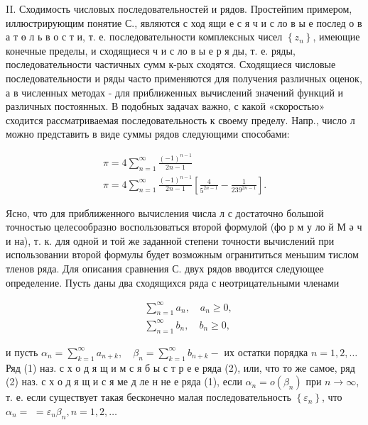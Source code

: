 \documentclass[10pt]{article}
\begin{document}
II. Сходимость числовых последовательностей и рядов. Простейпим примером, иллюстрирующим понятие С., являются с ход ящи е с я ч и с ло в ы е послед о в а т ө л ь в о с т и, т. е. последовательности комплексных чисел $\left\{z_{n}\right\}$, имеющие конечные пределы, и сходящиеся ч и с ло в ы е р я ды, т. е. ряды, последовательности частичных сумм к-рых сходятся. Сходящиеся числовые последовательности и ряды часто применяются для получения различных оценок, а в численных методах - для приближенных вычислений значений функций и различных постоянных. В подобных задачах важно, с какой «скоростью» сходится рассматриваемая последовательность к своему пределу. Напр., число л можно представить в виде суммы рядов следующими способами:



\[

\begin{gathered}

\pi=4 \sum_{n=1}^{\infty} \frac{(-1)^{n-1}}{2 n-1} \\

\pi=4 \sum_{n=1}^{\infty} \frac{(-1)^{n-1}}{2 n-1}\left[\frac{4}{5^{2 n-1}}-\frac{1}{239^{2 n-1}}\right] .

\end{gathered}

\]



Ясно, что для приближенного вычисления числа л с достаточно большой точностью целесообразно воспользоваться второй формулой (фо р м у ло й М ә ч и на), т. к. для одной и той же заданной степени точности вычислений при использовании второй формулы будет возможным огранититься меньшим тислом тленов ряда. Для описания сравнения С. двух рядов вводится следующее определение. Пусть даны два сходящихся ряда с неотрицательными членами



\[

\begin{aligned}

& \sum_{n=1}^{\infty} a_{n}, \quad a_{n} \geqslant 0, \\

& \sum_{n=1}^{\infty} b_{n}, \quad b_{n} \geqslant 0,

\end{aligned}

\]



и пусть $\alpha_{n}=\sum_{k=1}^{\infty} a_{n+k}, \quad \beta_{n}=\sum_{k=1}^{\infty} b_{n+k}-$ их остатки порядка $n=1,2, \ldots$ Ряд (1) наз. с х о д я щ и м с я б ы с т р е е ряда (2), или, что то же самое, ряд (2) наз. с х о д я щ и с я ме д ле н не е ряда (1), если $\alpha_{n}=o\left(\beta_{n}\right)$ при $n \rightarrow \infty$, т. е. если существует такая бесконечно малая последовательность $\left\{\varepsilon_{n}\right\}$, что $\alpha_{n}=$ $=\varepsilon_{n} \beta_{n}, n=1,2, \ldots$
\end{document}
